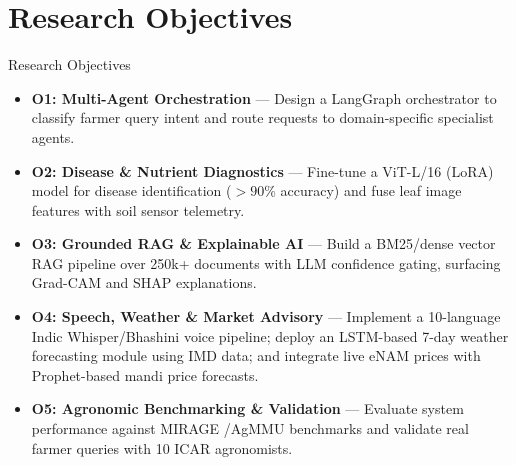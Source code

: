 \documentclass[aspectratio=169, 10pt]{beamer}
\begin{document}
\section{Research Objectives}
\begin{frame}{Research Objectives}
    \small
    \begin{itemize}
        \setlength{\itemsep}{0.3ex}
        \item \textbf{O1: Multi-Agent Orchestration} --- Design a LangGraph orchestrator to classify farmer query intent and route requests to domain-specific specialist agents.
        \item \textbf{O2: Disease \& Nutrient Diagnostics} --- Fine-tune a ViT-L/16 (LoRA) model for disease identification ($>90\%$ accuracy) and fuse leaf image features with soil sensor telemetry.
        \item \textbf{O3: Grounded RAG \& Explainable AI} --- Build a BM25/dense vector RAG pipeline over 250k+ documents with LLM confidence gating, surfacing Grad-CAM and SHAP explanations.
        \item \textbf{O4: Speech, Weather \& Market Advisory} --- Implement a 10-language Indic Whisper/Bhashini voice pipeline; deploy an LSTM-based 7-day weather forecasting module using IMD data; and integrate live eNAM prices with Prophet-based mandi price forecasts.
        \item \textbf{O5: Agronomic Benchmarking \& Validation} --- Evaluate system performance against MIRAGE \cite{mirage2025}/AgMMU \cite{agmmu2025} benchmarks and validate real farmer queries with 10 ICAR agronomists.
    \end{itemize}
\end{frame}

\end{document}
